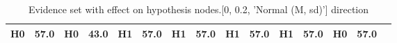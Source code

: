 \begin{table}
\begin{tabular}{c|cc|cc|cc|cc|cc|cc|cc}
\cellcolor{Bittersweet}H0&\cellcolor{Bittersweet}57.0&\cellcolor{Bittersweet}H0&\cellcolor{Bittersweet}43.0&\cellcolor{Bittersweet}H1&\cellcolor{Bittersweet}57.0&\cellcolor{Bittersweet}H1&\cellcolor{Bittersweet}57.0&\cellcolor{Bittersweet}H1&\cellcolor{Bittersweet}57.0&\cellcolor{Bittersweet}H1&\cellcolor{Bittersweet}57.0&\cellcolor{Bittersweet}H0&\cellcolor{Bittersweet}57.0\\\bottomrule\end{tabular}\caption{Evidence set with effect on hypothesis nodes.[0, 0.2, 'Normal (M, sd)'] direction}\end{table}